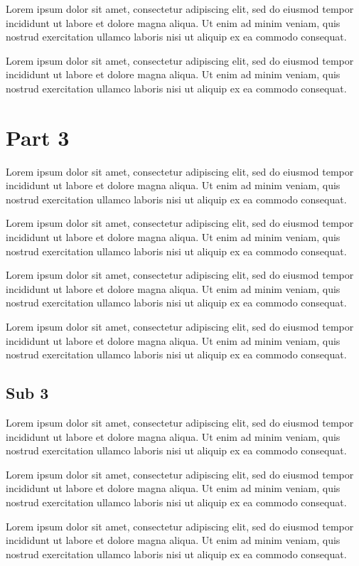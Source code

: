 \documentclass{article}
\begin{document}
Lorem ipsum dolor sit amet, consectetur adipiscing elit, sed do eiusmod tempor incididunt ut labore et dolore magna aliqua. Ut enim ad minim veniam, quis nostrud exercitation ullamco laboris nisi ut aliquip ex ea commodo consequat.

Lorem ipsum dolor sit amet, consectetur adipiscing elit, sed do eiusmod tempor incididunt ut labore et dolore magna aliqua. Ut enim ad minim veniam, quis nostrud exercitation ullamco laboris nisi ut aliquip ex ea commodo consequat.

\section{Part 3}
Lorem ipsum dolor sit amet, consectetur adipiscing elit, sed do eiusmod tempor incididunt ut labore et dolore magna aliqua. Ut enim ad minim veniam, quis nostrud exercitation ullamco laboris nisi ut aliquip ex ea commodo consequat.

Lorem ipsum dolor sit amet, consectetur adipiscing elit, sed do eiusmod tempor incididunt ut labore et dolore magna aliqua. Ut enim ad minim veniam, quis nostrud exercitation ullamco laboris nisi ut aliquip ex ea commodo consequat.

Lorem ipsum dolor sit amet, consectetur adipiscing elit, sed do eiusmod tempor incididunt ut labore et dolore magna aliqua. Ut enim ad minim veniam, quis nostrud exercitation ullamco laboris nisi ut aliquip ex ea commodo consequat.

Lorem ipsum dolor sit amet, consectetur adipiscing elit, sed do eiusmod tempor incididunt ut labore et dolore magna aliqua. Ut enim ad minim veniam, quis nostrud exercitation ullamco laboris nisi ut aliquip ex ea commodo consequat.

\subsection{Sub 3}
Lorem ipsum dolor sit amet, consectetur adipiscing elit, sed do eiusmod tempor incididunt ut labore et dolore magna aliqua. Ut enim ad minim veniam, quis nostrud exercitation ullamco laboris nisi ut aliquip ex ea commodo consequat.

Lorem ipsum dolor sit amet, consectetur adipiscing elit, sed do eiusmod tempor incididunt ut labore et dolore magna aliqua. Ut enim ad minim veniam, quis nostrud exercitation ullamco laboris nisi ut aliquip ex ea commodo consequat.

Lorem ipsum dolor sit amet, consectetur adipiscing elit, sed do eiusmod tempor incididunt ut labore et dolore magna aliqua. Ut enim ad minim veniam, quis nostrud exercitation ullamco laboris nisi ut aliquip ex ea commodo consequat.
\end{document}
